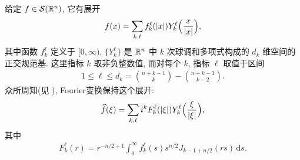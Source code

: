 给定 $f \in \mathcal{S}(\mathbb{R}^n)$, 它有展开
\begin{align*}
  f(x)=\sum_{k,\ell}f_{k}^{\ell}(|x|)Y_{k}^{\ell}\Bigl(\frac{x}{|x|}\Bigr),
\end{align*}
其中函数 $f_k^\ell$ 定义于 $[0, \infty)$, $\{Y_k^\ell\}$ 是 $\mathbb{R}^n$ 中 $k$ 次球调和多项式构成的 $d_k$ 维空间的正交规范基. 这里指标 $k$ 取非负整数值, 而对每个 $k$, 指标 $\ell$ 取值于区间
\begin{align*}
  1\leq\ell\leq d_{k}=\binom{n+k-1}{k}-\binom{n+k-3}{k-2}.
\end{align*}
众所周知(见 \cite{b14}), Fourier变换保持这个展开:
\begin{align*}
  \widehat{f}(\xi)=\sum_{k,\ell}i^{k}F_{k}^{\ell}(|\xi|)Y_{k}^{\ell}\Bigl(\frac{\xi}{|\xi|}\Bigr),
\end{align*}
其中
\begin{align*}
  F_{k}^{\ell}(r)=r^{-n/2+1}\int_{0}^{\infty}f_{k}^{\ell}(s)s^{n/2}J_{k-1+n/2}(r s)\,\mathrm{d}s.
\end{align*}

